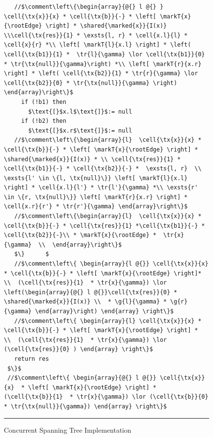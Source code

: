 \begin{figure}
\begin{lstlisting}
   //$\comment\left\{\begin{array}{@{} l @{} }  \cell{\tx{x}}{x} * \cell{\tx{b}}{-} * \left[ \markT{x}{\rootEdge} \right] * \shared{\marked{x}}{I(x)} \\\cell{\tx{res}}{1} * \exsts{l, r} * \cell{x.l}{l} * \cell{x}{r} *\\ \left[ \markT{l}{x.l} \right] * \left( \cell{\tx{b1}}{1} *  \tr{l}{\gamma} \lor \cell{\tx{b1}}{0} * \tr{\tx{null}}{\gamma}\right) *\\ \left[ \markT{r}{x.r} \right] * \left( \cell{\tx{b2}}{1} * \tr{r}{\gamma} \lor \cell{\tx{b2}}{0} * \tr{\tx{null}}{\gamma} \right)    \end{array}\right\}$  
     if (!b1) then 
       $\text{[}$x.l$\text{]}$:= null
     if (!b2) then 
       $\text{[}$x.r$\text{]}$:= null
   //$\comment\left\{\begin{array}{l}  \cell{\tx{x}}{x} * \cell{\tx{b}}{-} * \left[ \markT{x}{\rootEdge} \right] * \shared{\marked{x}}{I(x)} * \\ \cell{\tx{res}}{1} * \cell{\tx{b1}}{-} * \cell{\tx{b2}}{-} *  \exsts{l, r}  \\ \exsts{l' \in \{l, \tx{null}\}} \left[ \markT{l}{x.l} \right] * \cell{x.l}{l'} * \tr{l'}{\gamma} *\\ \exsts{r' \in \{r, \tx{null}\}} \left[ \markT{r}{x.r} \right] * \cell{x.r}{r'} * \tr{r'}{\gamma} \end{array}\right\}$  
   //$\comment\left\{\begin{array}{l}  \cell{\tx{x}}{x} * \cell{\tx{b}}{-} * \cell{\tx{res}}{1} *\cell{\tx{b1}}{-} * \cell{\tx{b2}}{-}\\ * \markT{x}{\rootEdge} *  \tr{x}{\gamma}  \\  \end{array}\right\}$         
   $\}		$
   //$\comment\left\{ \begin{array}{l @{}} \cell{\tx{x}}{x} * \cell{\tx{b}}{-} * \left[ \markT{x}{\rootEdge} \right]*  \\  (\cell{\tx{res}}{1}  * \tr{x}{\gamma}) \lor \left(\begin{array}{@{} l @{}}\cell{\tx{res}}{0} * \shared{\marked{x}}{I(x)} \\  * \g{l}{\gamma} * \g{r}{\gamma} \end{array}\right) \end{array} \right\}$ 
   //$\comment\left\{ \begin{array}{l} \cell{\tx{x}}{x} * \cell{\tx{b}}{-} * \left[ \markT{x}{\rootEdge} \right] *  \\  (\cell{\tx{res}}{1}  * \tr{x}{\gamma}) \lor (\cell{\tx{res}}{0} ) \end{array} \right\}$      
   return res
 $\}$
 //$\comment\left\{ \begin{array}{@{} l @{}} \cell{\tx{x}}{x}  * \left[ \markT{x}{\rootEdge} \right] *   (\cell{\tx{b}}{1}  * \tr{x}{\gamma}) \lor (\cell{\tx{b}}{0} * \tr{\tx{null}}{\gamma}) \end{array} \right\}$         
\end{lstlisting}
\hrule\vspace*{5pt}
\caption{Concurrent Spanning Tree Implementation}
\label{fig:conSpanningTree}
\end{figure}
%
%
